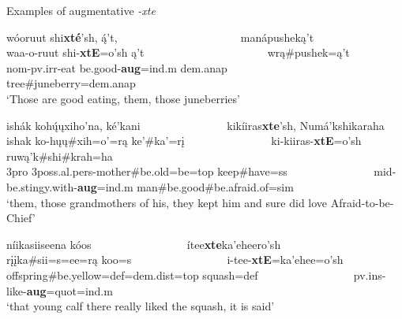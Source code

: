 \begin{exe}
\item\label{Ch3ExAugmentativeXTE} Examples of augmentative \textit{-xte}

	\begin{xlist}
	
	
	\item \glll wóoruut shi\textbf{xté}'sh, ą́'t, ~ ~ ~ ~ ~ ~ ~ ~ ~ ~ ~ ~ ~ manápusheką't\\
	waa-o-ruut shi-\textbf{xtE}=o'sh ą't ~ ~ ~ ~ ~ ~ ~ ~ ~ ~ ~ ~ ~  wrą\#pushek=ą't\\
	nom-pv.irr-\textnormal{eat} \textnormal{be.good}-\textbf{aug}=ind.m dem.anap ~ ~ ~ ~ ~ ~ ~ ~ ~ ~ ~ ~ ~  \textnormal{tree}\#\textnormal{juneberry}=dem.anap\\
	\glt `Those are good eating, them, those juneberries' \citep[53]{hollow1973a}
	
	\item \glll ishák kohų́ųxiho'na, ké'kani ~ ~ ~ ~ ~ ~ ~ ~ ~  kikíiras\textbf{xte}'sh, Numá'kshikaraha\\
	ishak ko-hųų\#xih=o'=rą ke'\#ka'=rį ~ ~ ~ ~ ~ ~ ~ ~ ~   ki-kiiras-\textbf{xtE}=o'sh ruwą'k\#shi\#krah=ha\\
	3pro 3poss.al.pers-\textnormal{mother}\#\textnormal{be.old}=\textnormal{be}=top \textnormal{keep}\#\textnormal{have}=ss ~ ~ ~ ~ ~ ~ ~ ~ ~ mid-\textnormal{be.stingy.with}-\textbf{aug}=ind.m \textnormal{man}\#\textnormal{be.good}\#\textnormal{be.afraid.of}=sim\\
	\glt `them, those grandmothers of his, they kept him and sure did love Afraid-to-be-Chief' \citep[64]{hollow1973a}
	
	\item \glll níikasiiseena kóos ~ ~ ~ ~ ~ ~ ~ ~ ~ ~ ítee\textbf{xte}ka'eheero'sh\\
	rįįka\#sii=s=ee=rą koo=s ~ ~ ~ ~ ~ ~ ~ ~ ~ ~  i-tee-\textbf{xtE}=ka'ehee=o'sh\\
	\textnormal{offspring}\#\textnormal{be.yellow}=def=dem.dist=top \textnormal{squash}=def ~ ~ ~ ~ ~ ~ ~ ~ ~ ~ pv.ins-\textnormal{like}-\textbf{aug}=quot=ind.m\\
	\glt `that young calf there really liked the squash, it is said' \citep[112]{hollow1973a}
	

\end{xlist}
\end{exe}
